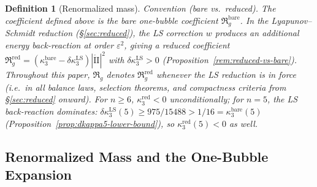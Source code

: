 \documentclass[11pt,reqno,a4paper]{amsart}
\numberwithin{equation}{section}
\theoremstyle{plain}
\newtheorem{definition}[theorem]{Definition}
\theoremstyle{remark}
\theoremstyle{plain}
\begin{document}
\begin{definition}[Renormalized mass]
\emph{Convention (bare vs.\ reduced).}
The coefficient defined above is the \emph{bare} one-bubble coefficient $\mathfrak R_g^{\mathrm{bare}}$.
In the Lyapunov--Schmidt reduction (\S\ref{sec:reduced}), the LS correction $w$ produces an additional
energy back-reaction at order $\varepsilon^2$, giving a \emph{reduced} coefficient
$\mathfrak R_g^{\mathrm{red}}=(\kappa_3^{\mathrm{bare}}-\delta\kappa_3^{\mathrm{LS}})|\mathring{\mathrm{II}}|^2$
with $\delta\kappa_3^{\mathrm{LS}}>0$ (Proposition~\ref{rem:reduced-vs-bare}).
Throughout this paper, $\mathfrak R_g$ denotes $\mathfrak R_g^{\mathrm{red}}$ whenever the LS reduction is in force
(i.e.\ in all balance laws, selection theorems, and compactness criteria from \S\ref{sec:reduced} onward).
For $n\ge6$, $\kappa_3^{\mathrm{red}}<0$ unconditionally;
for $n=5$, the LS back-reaction dominates:
$\delta\kappa_3^{\mathrm{LS}}(5)\ge 975/15488 > 1/16 = \kappa_3^{\mathrm{bare}}(5)$
(Proposition~\ref{prop:dkappa5-lower-bound}), so $\kappa_3^{\mathrm{red}}(5)<0$ as well.
\end{definition}


\subsection{Renormalized Mass and the One-Bubble Expansion}
\end{document}
